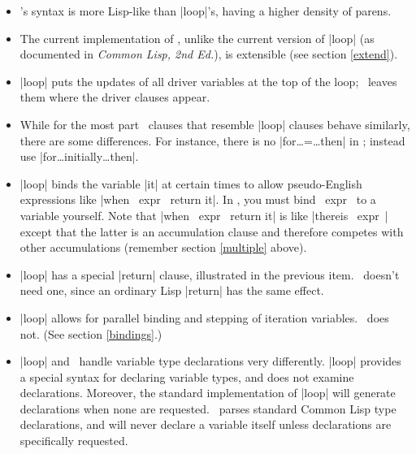 \begin{itemize}

\item \iter's syntax is more Lisp-like than |loop|'s, having a higher
density of parens.

\item The current implementation of \iter, unlike the current version
of  |loop| (as documented in {\em Common Lisp, 2nd Ed.\/}), is
extensible (see section \ref{extend}).  

\item |loop| puts the updates of all driver variables at the top of
the loop; \iter\ leaves them where the driver clauses appear.

\item While for the most part \iter\ clauses that resemble |loop| clauses
behave similarly, there are some differences.  For instance, there is
no |for\dots =\dots then| in \iter; instead use 
|for\dots initially\dots then|.  

\item |loop| binds the variable |it| at certain times
to allow pseudo-English expressions like |when ~expr~ return it|. 
In \iter, you must bind ~expr~ to a variable yourself.  Note that
|when ~expr~ return it| is like |thereis ~expr~| except that the latter is an
accumulation clause and therefore competes with other accumulations
(remember section \ref{multiple} above).


\item |loop| has a special |return| clause, illustrated in the
previous item.  \iter\ doesn't need one,  since an ordinary Lisp
|return| has the same effect.

\item |loop| allows for parallel binding and stepping of iteration
variables.  \iter\ does not.  (See section \ref{bindings}.)

\item |loop| and \iter\ handle variable type declarations very
differently.  |loop| provides a special syntax for declaring variable
types, and does not examine declarations.  Moreover, the standard
implementation of |loop| will
generate declarations when none are requested.
\iter\ parses standard Common Lisp type declarations, and will never
declare a variable itself unless declarations are 
specifically requested.

\end{itemize}

